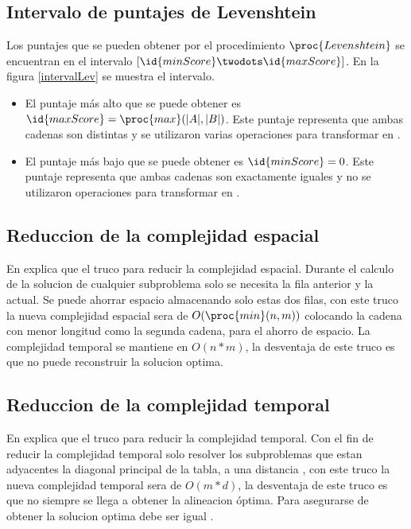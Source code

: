\subsection{Intervalo de puntajes de Levenshtein}
Los puntajes que se pueden obtener por el procedimiento $\proc{Levenshtein}$ se encuentran en el intervalo $[\id{minScore} \twodots \id{maxScore}]$. En la figura \ref{intervalLev} se muestra el intervalo.

\begin{itemize}
  \item El puntaje más alto que se puede obtener es $\id{maxScore} = \proc{max}(|A|,|B|)$. Este puntaje representa que ambas cadenas son distintas y se utilizaron varias operaciones para transformar  en .
  \item El puntaje más bajo que se puede obtener es $\id{minScore} = 0$. Este puntaje representa que ambas cadenas son exactamente iguales y no se utilizaron operaciones para transformar  en .
\end{itemize}

\subsection{Reduccion de la complejidad espacial}
En \cite{Halim2019} explica que el truco para reducir la complejidad espacial. Durante el calculo de la solucion de cualquier subproblema solo se necesita la fila anterior y la actual. Se puede ahorrar espacio almacenando solo estas dos filas, con este truco la nueva complejidad espacial sera de $O(\proc{min}(n,m))$ colocando la cadena con menor longitud como la segunda cadena, para el ahorro de espacio. La complejidad temporal se mantiene en $O(n*m)$, la desventaja de este truco es que no puede reconstruir la solucion optima.

\subsection{Reduccion de la complejidad temporal}
En \cite{Halim2019} explica que el truco para reducir la complejidad temporal. Con el fin de reducir la complejidad temporal solo resolver los subproblemas que estan adyacentes la diagonal principal de la tabla, a una distancia , con este truco la nueva complejidad temporal sera de $O(m * d)$, la desventaja de este truco es que no siempre se llega a obtener la alineacion óptima. Para asegurarse de obtener la solucion optima  debe ser igual .

